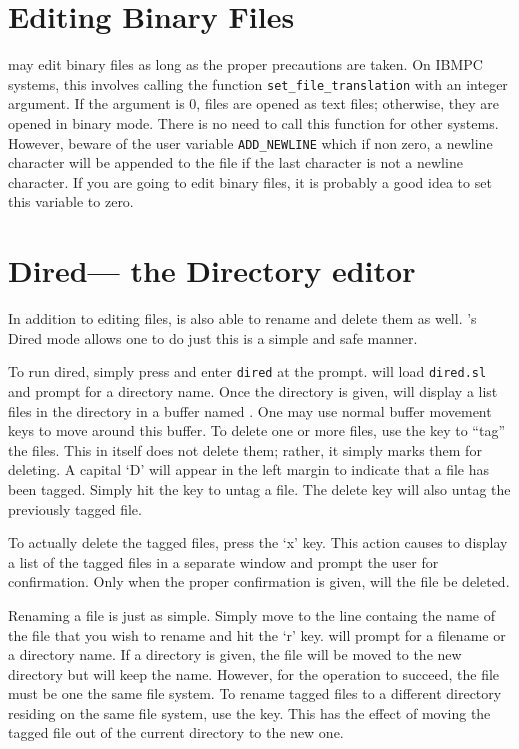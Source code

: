 \section{Editing Binary Files}

  \jed{} may edit binary files as long as the proper precautions are taken. On
  IBMPC systems, this involves calling the \slang{} function
  \verb|set_file_translation| with an integer argument.  If the argument is
  0, files are opened as text files; otherwise, they are opened in binary
  mode. There is no need to call this function for other systems.  However,
  beware of the user variable \verb|ADD_NEWLINE| which if non zero, a
  newline character will be appended to the file if the last character is
  not a newline character.  If you are going to edit binary files, it is
  probably a good idea to set this variable to zero.

\section{Dired--- the Directory editor}

  In addition to editing files, \jed{} is also able to rename and delete
  them as well.  \jed{}'s Dired mode allows one to do just this is a simple
  and safe manner.

  To run dired, simply press  and enter \verb|dired| at the
  prompt.  \jed{} will load \verb|dired.sl| and prompt for a directory name.
  Once the directory is given, \jed{} will display a list files in the
  directory in a buffer named .  One may use normal buffer
  movement keys to move around this buffer.  To delete one or more files,
  use the  key to ``tag'' the files.  This in itself does not delete
  them; rather, it simply marks them for deleting.  A capital `D' will
  appear in the left margin to indicate that a file has been tagged.  Simply
  hit the  key to untag a file.  The delete key will also untag the
  previously tagged file.

  To actually delete the tagged files, press the `x' key.  This action
  causes \jed{} to display a list of the tagged files in a separate window
  and prompt the user for confirmation.  Only when the proper confirmation
  is given, will the file be deleted.

  Renaming a file is just as simple.  Simply move to the line containg the
  name of the file that you wish to rename and hit the `r' key.  \jed{} will
  prompt for a filename or a directory name.  If a directory is given, the
  file will be moved to the new directory but will keep the name.  However,
  for the operation to succeed, the file must be one the same file system.
  To rename tagged files to a different directory residing on the same file
  system, use the  key.  This has the effect of moving the tagged
  file out of the current directory to the new one.

